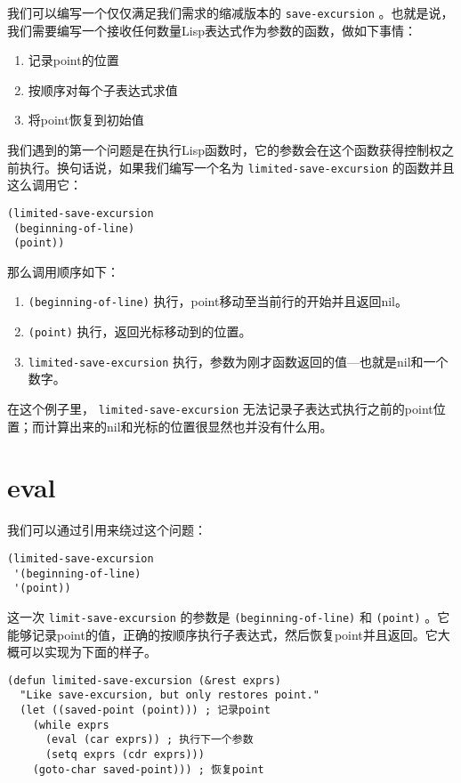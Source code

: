 我们可以编写一个仅仅满足我们需求的缩减版本的 \texttt{save-excursion} 。也就是说，我们需要编写一个接收任何数量Lisp表达式作为参数的函数，做如下事情：

\begin{enumerate}
  \item 记录point的位置
  \item 按顺序对每个子表达式求值
  \item 将point恢复到初始值
\end{enumerate}

我们遇到的第一个问题是在执行Lisp函数时，它的参数会在这个函数获得控制权之前执行。换句话说，如果我们编写一个名为 \texttt{limited-save-excursion} 的函数并且这么调用它：

\begin{verbatim}
(limited-save-excursion
 (beginning-of-line)
 (point))
\end{verbatim}

那么调用顺序如下：

\begin{enumerate}
  \item \texttt{(beginning-of-line)} 执行，point移动至当前行的开始并且返回nil。
  \item \texttt{(point)} 执行，返回光标移动到的位置。
  \item \texttt{limited-save-excursion} 执行，参数为刚才函数返回的值---也就是nil和一个数字。
\end{enumerate}

在这个例子里， \texttt{limited-save-excursion} 无法记录子表达式执行之前的point位置；而计算出来的nil和光标的位置很显然也并没有什么用。

\section{eval}
\label{section:08-eval}

我们可以通过引用来绕过这个问题：

\begin{verbatim}
(limited-save-excursion
 '(beginning-of-line)
 '(point))
\end{verbatim}

这一次 \texttt{limit-save-excursion} 的参数是 \texttt{(beginning-of-line)} 和 \texttt{(point)} 。它能够记录point的值，正确的按顺序执行子表达式，然后恢复point并且返回。它大概可以实现为下面的样子。

\begin{verbatim}
(defun limited-save-excursion (&rest exprs)
  "Like save-excursion, but only restores point."
  (let ((saved-point (point))) ; 记录point
    (while exprs
      (eval (car exprs)) ; 执行下一个参数
      (setq exprs (cdr exprs)))
    (goto-char saved-point))) ; 恢复point
\end{verbatim}

